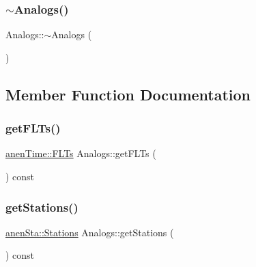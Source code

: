 \mbox{\label{class_analogs_ae6de501f002f0a3c878d44d5c7b67a0d}} 
\subsubsection{\texorpdfstring{$\sim$\+Analogs()}{~Analogs()}}
{\footnotesize\ttfamily Analogs\+::$\sim$\+Analogs (\begin{DoxyParamCaption}{ }\end{DoxyParamCaption})\hspace{0.3cm}{\ttfamily [virtual]}}



\subsection{Member Function Documentation}
\mbox{\label{class_analogs_a7803faee9bf541f68f7e9a5df762f684}} 
\subsubsection{\texorpdfstring{get\+F\+L\+Ts()}{getFLTs()}}
{\footnotesize\ttfamily \mbox{\hyperlink{classanen_time_1_1_f_l_ts}{anen\+Time\+::\+F\+L\+Ts}} Analogs\+::get\+F\+L\+Ts (\begin{DoxyParamCaption}{ }\end{DoxyParamCaption}) const}

\mbox{\label{class_analogs_aa618fe7556a1bc7ec39ddea07dc41a70}} 
\subsubsection{\texorpdfstring{get\+Stations()}{getStations()}}
{\footnotesize\ttfamily \mbox{\hyperlink{classanen_sta_1_1_stations}{anen\+Sta\+::\+Stations}} Analogs\+::get\+Stations (\begin{DoxyParamCaption}{ }\end{DoxyParamCaption}) const}

\mbox{\label{class_analogs_af30fe2ceec49634f69a9ce0d6f7665ea}} 
